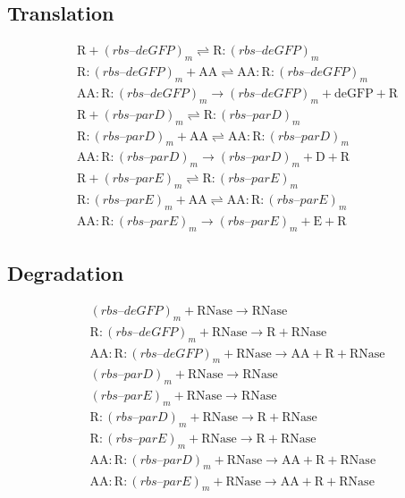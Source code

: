 \documentclass[english]{report}
\begin{document}
\subsection{Translation}

\begin{align}
& \mathrm{R} + (rbs\textrm{--}deGFP)_m \rightleftharpoons \mathrm{R}\!:\!(rbs\textrm{--}deGFP)_m \\
& \mathrm{R}\!:\!(rbs\textrm{--}deGFP)_m + \mathrm{AA} \rightleftharpoons \mathrm{AA}\!:\!\mathrm{R}\!:\!(rbs\textrm{--}deGFP)_m \\
& \mathrm{AA}\!:\!\mathrm{R}\!:\!(rbs\textrm{--}deGFP)_m \rightarrow (rbs\textrm{--}deGFP)_m + \mathrm{deGFP} + \mathrm{R} \\
& \mathrm{R} + (rbs\textrm{--}parD)_m \rightleftharpoons \mathrm{R}\!:\!(rbs\textrm{--}parD)_m \\
& \mathrm{R}\!:\!(rbs\textrm{--}parD)_m + \mathrm{AA} \rightleftharpoons \mathrm{AA}\!:\!\mathrm{R}\!:\!(rbs\textrm{--}parD)_m \\
& \mathrm{AA}\!:\!\mathrm{R}\!:\!(rbs\textrm{--}parD)_m \rightarrow (rbs\textrm{--}parD)_m + \mathrm{D} + \mathrm{R} \\
& \mathrm{R} + (rbs\textrm{--}parE)_m \rightleftharpoons \mathrm{R}\!:\!(rbs\textrm{--}parE)_m \\
& \mathrm{R}\!:\!(rbs\textrm{--}parE)_m + \mathrm{AA} \rightleftharpoons \mathrm{AA}\!:\!\mathrm{R}\!:\!(rbs\textrm{--}parE)_m \\
& \mathrm{AA}\!:\!\mathrm{R}\!:\!(rbs\textrm{--}parE)_m \rightarrow (rbs\textrm{--}parE)_m + \mathrm{E} + \mathrm{R} 
\end{align}

\subsection{Degradation}

\begin{align}
& (rbs\textrm{--}deGFP)_m + \mathrm{RNase} \rightarrow  \mathrm{RNase} \\
& \mathrm{R}\!:\!(rbs\textrm{--}deGFP)_m + \mathrm{RNase} \rightarrow \mathrm{R} + \mathrm{RNase} \\
& \mathrm{AA}\!:\!\mathrm{R}\!:\!(rbs\textrm{--}deGFP)_m + \mathrm{RNase} \rightarrow \mathrm{AA} + \mathrm{R} + \mathrm{RNase} \\
& (rbs\textrm{--}parD)_m + \mathrm{RNase} \rightarrow  \mathrm{RNase} \\
& (rbs\textrm{--}parE)_m + \mathrm{RNase} \rightarrow  \mathrm{RNase} \\
& \mathrm{R}\!:\!(rbs\textrm{--}parD)_m + \mathrm{RNase} \rightarrow \mathrm{R} + \mathrm{RNase} \\
& \mathrm{R}\!:\!(rbs\textrm{--}parE)_m + \mathrm{RNase} \rightarrow \mathrm{R} + \mathrm{RNase} \\
& \mathrm{AA}\!:\!\mathrm{R}\!:\!(rbs\textrm{--}parD)_m + \mathrm{RNase} \rightarrow \mathrm{AA} + \mathrm{R} + \mathrm{RNase} \\
& \mathrm{AA}\!:\!\mathrm{R}\!:\!(rbs\textrm{--}parE)_m + \mathrm{RNase} \rightarrow \mathrm{AA} + \mathrm{R} + \mathrm{RNase}
\end{align}
\end{document}
